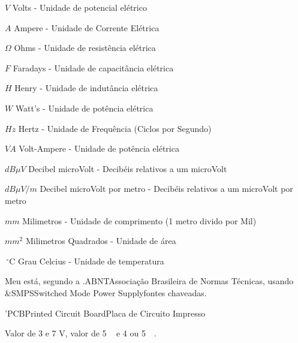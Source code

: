 \begin{simbolos}
   \item[$V$] Volts - Unidade de potencial elétrico
   \item[$A$] Ampere - Unidade de Corrente Elétrica
   \item[$\Omega$] Ohms - Unidade de resistência elétrica
   \item[$F$] Faradays - Unidade de capacitância elétrica
   \item[$H$] Henry - Unidade de indutância elétrica
   \item[$W$] Watt's - Unidade de potência elétrica
   \item[$Hz$] Hertz - Unidade de Frequência (Ciclos por Segundo)
   \item[$VA$] Volt-Ampere - Unidade de potência elétrica
   \item[$dB\mu V$] Decibel microVolt - Decibéis relativos a um microVolt
   \item[$dB\mu V/m$] Decibel microVolt por metro - Decibéis relativos a um microVolt por metro
   \item[$mm$] Milimetros - Unidade de comprimento (1 metro divido por Mil)
   \item[$mm^{2}$] Milimetros Quadrados - Unidade de área
   \item[$\,^{\circ}\mathrm{C}$] Grau Celcius - Unidade de temperatura
\end{simbolos}



Meu  está, segundo a \abreviatura.{ABNT}{Associação Brasileira de Normas Técnicas}, usando \abreviatura&{SMPS}{Switched Mode Power Supply}{fontes chaveadas}.

\abreviatura'{PCB}{Printed Circuit Board}{Placa de Circuito Impresso}


Valor de 3  e
7 \si{\volt},
valor de 5 \si{\micro{}} e
4 
ou \SI{5}{\milli{}}.


